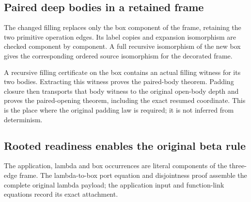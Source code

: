 \subsection{Paired deep bodies in a retained frame}
The changed filling replaces only the box component of the frame, retaining the two primitive operation edges. Its label copies and expansion isomorphism are checked component by component. A full recursive isomorphism of the new box gives the corresponding ordered source isomorphism for the decorated frame.

A recursive filling certificate on the box contains an actual filling witness for its two bodies. Extracting this witness proves the paired-body theorem. Padding closure then transports that body witness to the original open-body depth and proves the paired-opening theorem, including the exact resumed coordinate. This is the place where the original padding law is required; it is not inferred from determinism.
\par{}
\par{}

\subsection{Rooted readiness enables the original beta rule}
The application, lambda and box occurrences are literal components of the three-edge frame. The lambda-to-box port equation and disjointness proof assemble the complete original lambda payload; the application input and function-link equations record its exact attachment.

